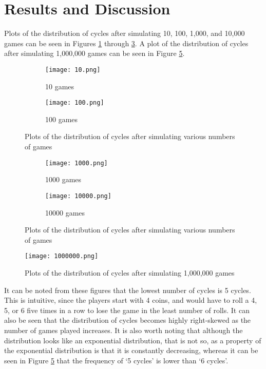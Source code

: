 \section{Results and Discussion}
\label{results}

Plots of the distribution of cycles after simulating 10, 100, 1,000, and 10,000 games can be seen in Figures \ref{fig:10} through \ref{fig:10000}. A plot of the distribution of cycles after simulating 1,000,000 games can be seen in Figure \ref{fig:1000000}.

\begin{figure}[H]
\centering
\begin{subfigure}{.4\textwidth}
  \centering
  \texttt{[image: 10.png]}
  \caption{10 games}
  \label{fig:10}
\end{subfigure}%
\begin{subfigure}{.4\textwidth}
  \centering
  \texttt{[image: 100.png]}
  \caption{100 games}
\end{subfigure}
\caption{Plots of the distribution of cycles after simulating various numbers of games}
\label{fig:dist}
\end{figure}

\begin{figure}[H]
\centering
\begin{subfigure}{.5\textwidth}
  \centering
  \texttt{[image: 1000.png]}
  \caption{1000 games}
\end{subfigure}%
\begin{subfigure}{.5\textwidth}
  \centering
  \texttt{[image: 10000.png]}
  \caption{10000 games}
  \label{fig:10000}
\end{subfigure}
\caption{Plots of the distribution of cycles after simulating various numbers of games}
\label{fig:dist}
\end{figure}

\begin{figure}[H]
\centering
\texttt{[image: 1000000.png]}
\caption{Plots of the distribution of cycles after simulating 1,000,000 games}
\label{fig:1000000}
\end{figure}

It can be noted from these figures that the lowest number of cycles is 5 cycles. This is intuitive, since the players start with 4 coins, and would have to roll a 4, 5, or 6 five times in a row to lose the game in the least number of rolls. It can also be seen that the distribution of cycles becomes highly right-skewed as the number of games played increases. It is also worth noting that although the distribution looks like an exponential distribution, that is not so, as a property of the exponential distribution is that it is constantly decreasing, whereas it can be seen in Figure \ref{fig:1000000} that the frequency of `5 cycles' is lower than `6 cycles'.

